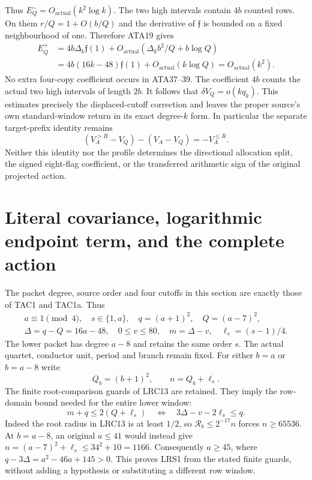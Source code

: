 Thus $E_Q^-=O_{\mathrm{actual}}(k^2\log k)$.
The two high intervals contain $4b$ counted rows.  On them
$r/Q=1+O(b/Q)$ and the derivative of $\mathfrak f$ is bounded
on a fixed neighbourhood of one.  Therefore ATA19 gives
\[
\begin{split}
 E_Q^+
 &=4b\Delta_k\mathfrak f(1)
       +O_{\mathrm{actual}}(\Delta_kb^2/Q+b\log Q)\\
 &=4b(16k-48)\mathfrak f(1)+O_{\mathrm{actual}}(k\log Q)
  =O_{\mathrm{actual}}(k^2).
\end{split}\tag{ATA39}
\]
No extra four-copy coefficient occurs in ATA37--39.  The coefficient
$4b$ counts the actual two high intervals of length $2b$.
It follows that $\delta V_Q=o(kq_k)$.  This estimates precisely the
displaced-cutoff correction and leaves the proper source's own
standard-window return in its exact degree-$k$ form.
In particular the separate target-prefix identity remains
\[
 (V_A^{>R}-V_Q)-(V_A-V_Q)=-V_A^{\le R}.                 \tag{ATA40}
\]
Neither this identity nor the profile determines the directional
allocation split, the signed eight-flag coefficient, or the transferred
arithmetic sign of the original projected action.
\endgroup


\section{Literal covariance, logarithmic endpoint term, and the complete action}
\label{sec:lrc-scalar-reconstruction}

The packet degree, source order and four cutoffs in this section are
exactly those of TAC1 and TAC1a.  Thus
\[
\begin{gathered}
 a\equiv1\pmod4,\quad s\in\{1,a\},\quad
 q=(a+1)^2,\quad Q=(a-7)^2,\\ \Delta=q-Q=16a-48,
 \quad 0\le v\le80,\quad m=\Delta-v,
 \quad \ell_s=(s-1)/4.
\end{gathered}
\]
The lower packet has degree $a-8$ and retains the same order $s$.
The actual quartet, conductor unit, period and branch remain fixed.
For either $b=a$ or $b=a-8$ write
\[
 Q_b=(b+1)^2,\qquad n=Q_b+\ell_s.
\]
The finite root-comparison guards of LRC13 are retained.  They imply
the row-domain bound needed for the entire lower window:
\begin{equation}\tag{LRS1}
 m+q\le2(Q+\ell_s)
 \quad\Longleftrightarrow\quad 3\Delta-v-2\ell_s\le q.
\end{equation}
Indeed the root radius in LRC13 is at least $1/2$, so
$\mathscr R_b\le2^{-17}n$ forces $n\ge65536$.
At $b=a-8$, an original $a\le41$ would instead give
$n=(a-7)^2+\ell_s\le34^2+10=1166$.
Consequently $a\ge45$, where $q-3\Delta=a^2-46a+145>0$.
This proves LRS1 from the stated finite guards, without adding a
hypothesis or substituting a different row window.

